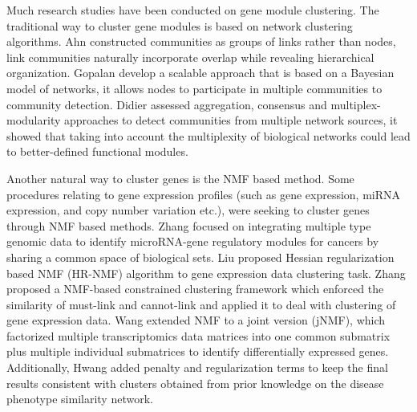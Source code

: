 \documentclass{bmcart}
\begin{document}

Much research studies have been conducted on gene module clustering. The traditional way to cluster gene modules is based on network clustering algorithms.
Ahn \cite{Ahn2010} constructed communities as groups of links rather than nodes, link communities naturally incorporate overlap while revealing hierarchical organization. Gopalan \cite{Gopalan2013} develop a scalable approach that is based on a Bayesian model of networks, it allows nodes to participate in multiple communities to community detection. Didier \cite{Didier2015} assessed aggregation, consensus and multiplex-modularity approaches to detect communities from multiple network sources, it showed that taking into account the multiplexity of biological networks could lead to better-defined functional modules.

Another natural way to cluster genes is the NMF based method. Some procedures relating to gene expression profiles (such as gene expression, miRNA expression, and copy number variation etc.), were seeking to cluster genes through NMF based methods.
Zhang \cite{Zhang2011} focused on integrating multiple type genomic data to identify microRNA-gene regulatory modules for cancers by sharing a common space of biological sets. Liu \cite{XiaoLiu2015} proposed Hessian regularization based NMF (HR-NMF) algorithm to gene expression data  clustering task. Zhang \cite{Zhang2015} proposed a NMF-based constrained clustering framework which enforced the similarity of must-link and cannot-link and applied it to deal with clustering of gene expression data. Wang \cite{Wang2015} extended NMF to a joint version (jNMF), which factorized multiple transcriptomics data matrices into one common submatrix plus multiple individual submatrices to identify differentially expressed genes.
Additionally,
Hwang \cite{Hwang2012} added penalty and regularization terms to keep the final results consistent with clusters obtained from prior knowledge on the disease phenotype similarity network.
\end{document}

